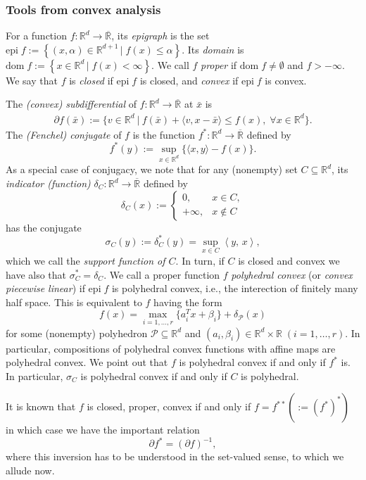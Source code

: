 \documentclass[reqno]{amsart}
\numberwithin{equation}{section}
\newcommand{\R}{\mathbb{R}}
\newcommand{\pol}{\mathcal{P}}
\newcommand{\x}{\bar{x}}
\newcommand{\set}[2]{\left\{#1\,\left\vert\; #2\right.\right\}}
\newcommand{\ip}[2]{\left\langle #1,\, #2\right\rangle}
\newcommand{\epi}{\mathrm{epi}\;}
\newcommand{\dom}{\mathrm{dom}\;}
\begin{document}
\subsubsection{Tools from convex analysis} 
For a  function $f : \R^d \to \overline{\R}$, its {\em epigraph} is the set $\epi f:=\set{(x,\alpha)\in \R^{d+1}}{f(x)\leq \alpha}$. Its {\em domain} is $\dom f:=\set{x\in \R^d}{f(x) < \infty}$. We call $f$ {\em proper} if $\dom f\neq \emptyset$ and $f>-\infty$. We say that $f$ is {\em closed} if $\epi f$ is closed, and {\em convex} if $\epi f$ is convex.


The \emph{(convex) subdifferential} of $f: \R^d \to \overline{\R}$ at $\bar{x}$ is \begin{align*}
    \partial f (\bar{x}) := \{v \in \R^d \ | \ f(\x)+\langle v, x - \x \rangle  \le f(x), \; \forall x \in \R^d \}.
\end{align*} 
The \emph{(Fenchel) conjugate} of   $f$ is the function $f^* : \R^d \to \overline{\R}$ defined by 
\[
f^*(y) := \sup_{x \in \R^d} \{\langle x, y \rangle - f(x)\}.
\]
As a special case of conjugacy, we note that for any (nonempty) set  $C\subseteq\R^d$, its \emph{indicator (function)} $\delta_C:\R^d\to\overline{\R}$ defined by
\[
\delta_C(x):=\begin{cases}0, & x\in C,\\ +\infty,& x\notin C
\end{cases}
\]
has the conjugate
\[
\sigma_C(y):=\delta_C^*(y)=\sup_{x\in C} \ip{y}{x},
\]
which we call the {\em support function of $C$}. In turn, if $C$ is closed and convex we have also that $\sigma_C^*=\delta_C$.
We call a proper function $f$ {\em polyhedral convex} (or {\em convex piecewise linear}) if $\epi f$ is polyhedral convex, i.e., the interection of finitely many half space. This is equivalent to $f$ having the form
\[
f(x)=\max_{i=1,\dots,r}\{a_i^Tx+\beta_i\}+\delta_\pol(x)
\]
for some (nonempty) polyhedron $\pol\subseteq\R^d$ and $(a_i,\beta_i)\in \R^d\times \R\;(i=1,\dots,r)$. In particular, compositions of polyhedral convex functions with affine maps are polyhedral convex.
We point out that \cite[ Theorem 11.14]{RoW 98} $f$ is polyhedral convex if and only if $f^*$ is.  In particular, $\sigma_C$ is polyhedral convex if and only if $C$ is polyhedral.


It is known \cite[Theorem 11.1]{RoW 98} that $f$ is closed, proper, convex if and only if $f=f^{**}(:=(f^*)^*)$ in which case we have the important relation \cite[Proposition 11.3]{RoW 98}
\begin{equation}\label{eq:SDInversion}
\partial f^* = (\partial f)^{-1},
\end{equation}
where this inversion has to be understood in the set-valued sense, to which we allude now. 
\end{document}
